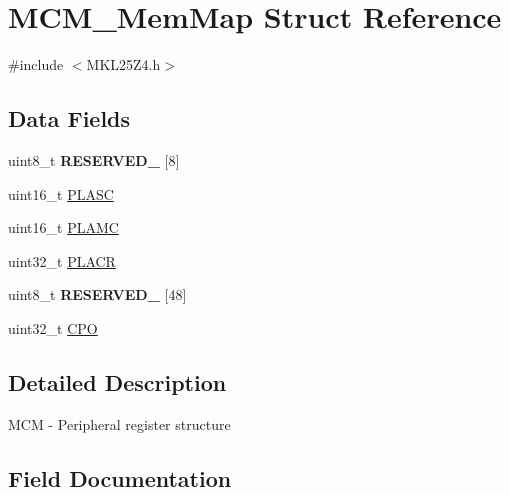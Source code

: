 \hypertarget{struct_m_c_m___mem_map}{}\section{M\+C\+M\+\_\+\+Mem\+Map Struct Reference}
\label{struct_m_c_m___mem_map}


{\ttfamily \#include $<$M\+K\+L25\+Z4.\+h$>$}

\subsection*{Data Fields}
\begin{DoxyCompactItemize}
\item 
\hypertarget{struct_m_c_m___mem_map_ab5b3e978eb3ceb8a2aadaeeab28db00b}{}uint8\+\_\+t {\bfseries R\+E\+S\+E\+R\+V\+E\+D\+\_} \mbox{[}8\mbox{]}\label{struct_m_c_m___mem_map_ab5b3e978eb3ceb8a2aadaeeab28db00b}

\item 
uint16\+\_\+t \hyperlink{struct_m_c_m___mem_map_a20825db9d55d933be269bd35a200fd2d}{P\+L\+A\+S\+C}
\item 
uint16\+\_\+t \hyperlink{struct_m_c_m___mem_map_a93b5b2392197fc5d6806ef7d6c131068}{P\+L\+A\+M\+C}
\item 
uint32\+\_\+t \hyperlink{struct_m_c_m___mem_map_aa33a270057a47b918858749d81ff626c}{P\+L\+A\+C\+R}
\item 
\hypertarget{struct_m_c_m___mem_map_ad8a834e9c0be4b8a1f57679868c10f2d}{}uint8\+\_\+t {\bfseries R\+E\+S\+E\+R\+V\+E\+D\+\_} \mbox{[}48\mbox{]}\label{struct_m_c_m___mem_map_ad8a834e9c0be4b8a1f57679868c10f2d}

\item 
uint32\+\_\+t \hyperlink{struct_m_c_m___mem_map_a35ef884d3cd29240febb8d3fc3df26d0}{C\+P\+O}
\end{DoxyCompactItemize}


\subsection{Detailed Description}
M\+C\+M -\/ Peripheral register structure 

\subsection{Field Documentation}
\hypertarget{struct_m_c_m___mem_map_a35ef884d3cd29240febb8d3fc3df26d0}{}
